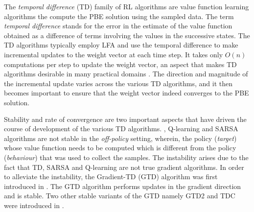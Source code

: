 The \emph{temporal difference} (TD) family of RL algorithms are value function learning algorithms the compute the PBE solution using the sampled data. The term \emph{temporal difference} stands for the  error in the estimate of the value function obtained as a difference of terms involving the values in the successive states. The TD algorithms typically employ LFA and use the temporal difference to make incremental updates to the weight vector at each time step. It takes only $O(n)$ computations per step to update the weight vector, an aspect that makes TD algorithms desirable in many practical domains \cite{}. The direction and magnitude of the incremental update varies across the various TD algorithms, and it then becomes important to ensure that the weight vector indeed converges to the PBE solution. 
\begin{comment}
The issue with TD($0$) is that it makes use of only the current sample and is not sample efficient. This issue was alleviated by the LTSD by making use of all the data to estimate and solve an empirical PBE. Since LSTD involves matrix updates and inversions at each step its computational complexity is minimum $O(n^2)$. In contrast, since simple TD($0$) involves only $O(n)$ computations per step, it continues to be of interest in applications in which cannot afford $O(n^2)$ required by LSTD.\par
\end{comment}
Stability and rate of convergence are two important aspects that have driven the course of development of the various TD algorithms. \tdo, Q-learning and SARSA algorithms are not stable in the \emph{off-policy} setting, wherein, the policy (\emph{target}) whose value function needs to be  computed which is different from the policy (\emph{behaviour}) that was used to collect the samples. The instability arises due to the fact that TD, SARSA and Q-learning are not true gradient algorithms. In order to alleviate the instability, the Gradient-TD (GTD)  algorithm was first introduced in \cite{}. The GTD algorithm performs updates in the gradient direction and is stable. Two other stable variants of the GTD namely GTD2 and TDC were introduced in \cite{}.\par
